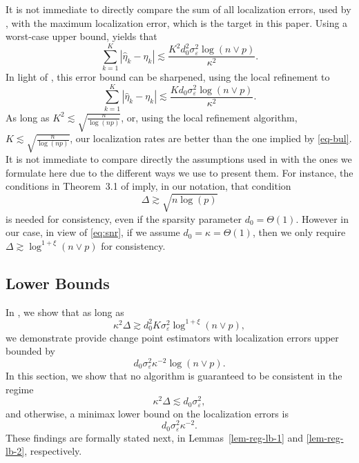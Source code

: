 \documentclass[twoside]{article}
\begin{document}
	 	It is not immediate to directly compare the sum of all localization errors, used by \cite{leonardi2016computationally}, with the maximum localization error, which is the target in this paper.  Using a worst-case upper bound,  yields that 
	 	\[
	 		\sum_{k = 1}^K |\hat{\eta}_k - \eta_k| \lesssim \frac{K^2 d_0^2 \sigma^2_{\varepsilon} \log(n\vee p)}{\kappa^2}.
	 	\]
	 	In light of , this error bound can be sharpened, using the local refinement  to
	 	\[
	 		\sum_{k = 1}^K |\hat{\eta}_k - \eta_k| \lesssim \frac{K d_0 \sigma^2_{\varepsilon} \log(n\vee p)}{\kappa^2}.
	 	\]
	 	As long as $K^2 \lesssim \sqrt{\frac{n}{\log(np)}}$, or, using the local refinement algorithm,  $K\lesssim \sqrt{\frac{n}{\log(np)}}$, our localization rates are better than the one implied by \eqref{eq-bul}.
	 	It is not immediate to compare directly the assumptions used in \cite{leonardi2016computationally} with the ones we formulate here due to the different ways we use to present them.  For instance, the conditions in Theorem~3.1 of \cite{leonardi2016computationally} imply, in our notation, that condition 
	 		\[
	 			\Delta \gtrsim \sqrt{n \log(p)}
	 		\]
	 		is needed for consistency,
	 		even if the sparsity parameter $d_0 = \Theta(1)$.  However in our case, in view of \eqref{eq:snr}, if we assume $d_0 = \kappa = \Theta(1)$, then we only require $\Delta \gtrsim \log^{1 + \xi}(n\vee p)$ for consistency.

	
\subsection{Lower Bounds}

In , we show that as long as
	\[
		\kappa^2 \Delta \gtrsim d_0^2 K \sigma^2_{\varepsilon} \log^{1+\xi}(n \vee p), 
	\]
	we demonstrate provide change point estimators with localization errors upper bounded by
	\[
		d_0 \sigma^2_{\varepsilon} \kappa^{-2} \log(n \vee p).
	\]
	In this section, we show that no algorithm is guaranteed to be consistent in the regime
	\[
		\kappa^2 \Delta \lesssim d_0 \sigma^2_{\varepsilon},
	\]
	and otherwise, a minimax lower bound on the localization errors is
	\[
		d_0 \sigma^2_{\varepsilon} \kappa^{-2}.
	\]
These findings are formally stated next, in  Lemmas~\ref{lem-reg-lb-1} and \ref{lem-reg-lb-2}, respectively.  
\end{document}
